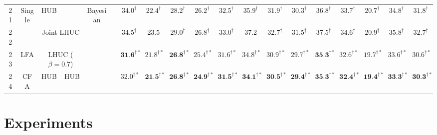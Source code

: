 \documentclass{INTERSPEECH2023}
\newcommand{\xmark}{\ding{55}}
\begin{document}
\begin{table}[htbp]
{\begin{tabular}{c|c|cc|c|c|ccc|cccc|ccc|ccc}
21 & \multirow{2}{*}{Single} & HUB & \xmark &\multirow{4}{*}{Bayesian} & & $34.0^{\dagger}$ & $22.4^{\dagger}$ & $28.2^{\dagger}$ & $26.2^{\dagger}$ & $32.5^{\dagger}$ & $35.9^{\dagger}$ & $31.9^{\dagger}$ & $30.3^{\dagger}$ & $36.8^{\dagger}$ & $33.7^{\dagger}$ & $20.7^{\dagger}$ & $34.8^{\dagger}$ & $31.8^{\dagger}$ \\ 
22 &  & \multicolumn{2}{c|}{Joint LHUC} & & & $34.5^{\dagger}$ & 23.5 & $29.0^{\dagger}$ & $26.8^{\dagger}$ & $33.0^{\dagger}$ & 37.2 & $32.7^{\dagger}$ & $31.5^{\dagger}$ & $37.5^{\dagger}$ & $34.6^{\dagger}$ & $20.9^{\dagger}$ & $35.8^{\dagger}$ & $32.7^{\dagger}$ \\ \cline{2-2}
23 & LFA &\multicolumn{2}{c|}{LHUC ($\beta=0.7$)} & & & $\textbf{31.6}^{\dagger\ast}$ & $21.8^{\dagger\ast}$ & $\textbf{26.8}^{\dagger\ast}$ & $25.4^{\dagger\ast}$ & $31.6^{\dagger\ast}$ & $34.8^{\dagger\ast}$ & $30.9^{\dagger\ast}$ & $29.7^{\dagger\ast}$ & $\textbf{35.3}^{\dagger\ast}$ & $32.6^{\dagger\ast}$ & $19.7^{\dagger\ast}$ & $33.6^{\dagger\ast}$ & $30.6^{\dagger\ast}$ \\ \cline{2-2}
24 & CFA & HUB & HUB & & & $32.0^{\dagger\ast}$ & $\textbf{21.5}^{\dagger\ast}$ & $\textbf{26.8}^{\dagger\ast}$ & $\textbf{24.9}^{\dagger\ast}$ & $\textbf{31.5}^{\dagger\ast}$ & $\textbf{34.1}^{\dagger\ast}$ & $\textbf{30.5}^{\dagger\ast}$ & $\textbf{29.4}^{\dagger\ast}$ & $\textbf{35.3}^{\dagger\ast}$ & $\textbf{32.4}^{\dagger\ast}$ & $\textbf{19.4}^{\dagger\ast}$ & $\textbf{33.3}^{\dagger\ast}$ & $\textbf{30.3}^{\dagger\ast}$ \\ 


\hline\hline
\end{tabular} 
}
\vspace{-0.6cm}
\end{table}

\section{Experiments}
\end{document}
